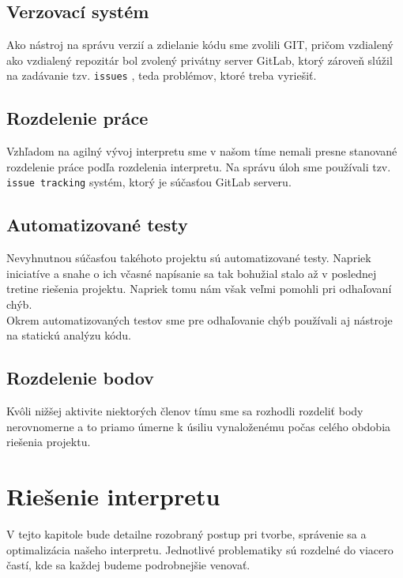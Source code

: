\documentclass[12pt, a4paper]{article}
\begin{document}
        \subsection{Verzovací systém}
			Ako nástroj na správu verzií a zdielanie kódu sme zvolili GIT, pričom vzdialený ako vzdialený repozitár bol zvolený privátny server GitLab, ktorý zároveň slúžil na zadávanie tzv. \texttt{issues} , teda problémov, ktoré treba vyriešiť.
		\subsection{Rozdelenie práce}
			Vzhľadom na agilný vývoj interpretu sme v našom tíme nemali presne stanované rozdelenie práce podľa rozdelenia interpretu. Na správu úloh sme používali tzv. \texttt{issue tracking} systém, ktorý je súčasťou GitLab serveru.
        \subsection{Automatizované testy}
	        Nevyhnutnou súčasťou takéhoto projektu sú automatizované testy. Napriek iniciatíve a snahe o ich včasné napísanie sa tak bohužial stalo až v poslednej tretine riešenia projektu. Napriek tomu nám však veľmi pomohli pri odhaľovaní chýb.\\
	        Okrem automatizovaných testov sme pre odhaľovanie chýb používali aj nástroje na statickú analýzu kódu.
	    \subsection{Rozdelenie bodov}
		    Kvôli nižšej aktivite niektorých členov tímu sme sa rozhodli rozdeliť body nerovnomerne a to priamo úmerne k úsiliu vynaloženému počas celého obdobia riešenia projektu.
	\section{Riešenie interpretu}
	    V tejto kapitole bude detailne rozobraný postup pri tvorbe, správenie sa a optimalizácia našeho interpretu. Jednotlivé problematiky sú rozdelné do viacero častí, kde sa každej budeme podrobnejšie venovať.
\end{document}
